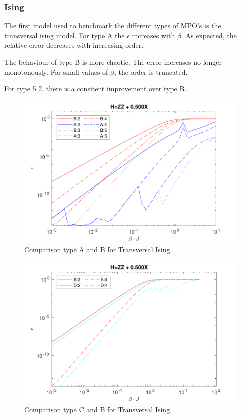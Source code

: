 \subsubsection{Ising}



The first model used to benchmark the different types of MPO's is the transversal ising model. For type A the $\epsilon$ increases with
$\beta$. As expected, the relative error decreases with increasing order.

The behaviour of type B is more chaotic. The error increases no longer monotonously. For small values of $\beta$, the order is truncated.

For type 5 \cref{bench:ising5}, there is a consitent improvement over type B. 


\begin{figure}[H]
    \center
    \includegraphics[width=\textwidth]{Figuren/benchmarking/t_ising.pdf}
    \caption{Comparison type A and B for Transversal Ising}
    \label{fig:benchmark:tising}
\end{figure}


\begin{figure}[H]
    \center
    \includegraphics[width=\textwidth]{Figuren/benchmarking/type5/ising.pdf}
    \caption{Comparison type C and B for Transversal Ising}
    \label{bench:ising5}
\end{figure}

